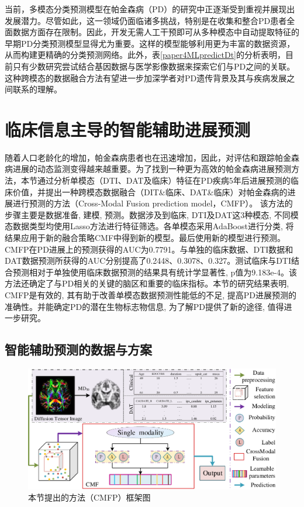 当前，多模态分类预测模型在帕金森病（PD）的研究中正逐渐受到重视并展现出发展潜力。尽管如此，这一领域仍面临诸多挑战，特别是在收集和整合PD患者全面数据方面存在限制。因此，开发无需人工干预即可从多种模态中自动提取特征的早期PD分类预测模型显得尤为重要。这样的模型能够利用更为丰富的数据资源，从而构建更精确的分类预测网络。此外，表\ref{paper4MLpredictDt}的分析表明，目前只有少数研究尝试结合基因数据与医学影像数据来探索它们与PD之间的关联。这种跨模态的数据融合方法有望进一步加深学者对PD遗传背景及其与疾病发展之间联系的理解。


\section{临床信息主导的智能辅助进展预测}\label{chapter5.2:pdCMF-Net}
随着人口老龄化的增加，帕金森病患者也在迅速增加，因此，对评估和跟踪帕金森病进展的动态监测变得越来越重要。为了找到一种更为高效的帕金森病进展预测方法，本节通过分析单模态（DTI、DAT及临床）特征在PD疾病5年后进展预测的临床价值，并提出一种跨模态数据融合（DIT\&临床、DAT\&临床）对帕金森病的进展进行预测的方法（Cross-Modal Fusion prediction model，CMFP）。
该方法的步骤主要是数据准备, 建模, 预测。数据涉及到临床, DTI及DAT这3种模态, 不同模态数据类型均使用Lasso方法进行特征筛选。各单模态采用AdaBoost进行分类, 将结果应用于新的融合策略CMF中得到新的模型。最后使用新的模型进行预测。CMFP在PD进展上的预测获得的AUC为0.7791。与单独的临床数据、DTI数据和DAT数据预测所获得的AUC分别提高了0.2448、0.3078、0.327。测试临床与DTI结合预测相对于单独使用临床数据预测的结果具有统计学显著性, p值为9.183e-4。该方法还确定了与PD相关的关键的脑区和重要的临床指标。本节的研究结果表明, CMFP是有效的, 其有助于改善单模态数据预测性能低的不足, 提高PD进展预测的准确性。并能确定PD的潜在生物标志物信息, 为了解PD提供了新的途径, 值得进一步研究。

\subsection{智能辅助预测的数据与方案}

    \begin{figure}[ht]
      \centering
      \includegraphics[width=0.9\linewidth]{figs/paper5FrameworkNew.pdf}
      \caption{本节提出的方法（CMFP）框架图}\label{paper5FrameworkNew}
     \end{figure} 

